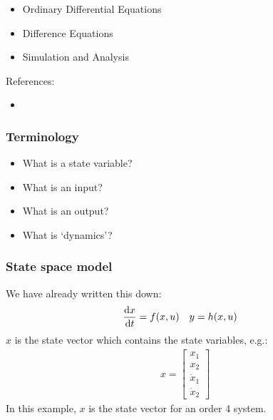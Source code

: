 \documentclass{beamer-control}
\begin{document}

\begin{SUMMARY}
\begin{itemize}
\item Ordinary Differential Equations
\item Difference Equations
\item Simulation and Analysis
\end{itemize}
\vfill References:
\begin{itemize}
\item {}
\end{itemize}
\end{SUMMARY}


\begin{frame}
\frametitle{Terminology}
\begin{itemize}
\item What is a state variable?
\item What is an input?
\item What is an output?
\item What is `dynamics'?
\end{itemize}
\end{frame}


\begin{frame}
\frametitle{State space model}
We have already written this down:
\begin{align}
\frac{\mathrm{d} x}{\mathrm{d} t} &= f(x,u) & y &= h(x,u)
\end{align}
$x$ is the state vector which contains the state variables, e.g.:
\begin{align}
x = \begin{bmatrix} x_1 \\ x_2 \\ \dot x_1 \\ \dot x_2 \end{bmatrix}
\end{align}
In this example, $x$ is the state vector for an order 4 system.
\end{frame}
\end{document}
